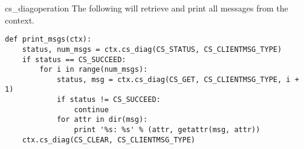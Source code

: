 \begin{methoddesc}[CS_CONTEXT]{cs_diag}{operation \optional{, \ldots}}
The following will retrieve and print all messages from the context.

\begin{verbatim}
def print_msgs(ctx):
    status, num_msgs = ctx.cs_diag(CS_STATUS, CS_CLIENTMSG_TYPE)
    if status == CS_SUCCEED:
        for i in range(num_msgs):
            status, msg = ctx.cs_diag(CS_GET, CS_CLIENTMSG_TYPE, i + 1)
            if status != CS_SUCCEED:
                continue
            for attr in dir(msg):
                print '%s: %s' % (attr, getattr(msg, attr))
    ctx.cs_diag(CS_CLEAR, CS_CLIENTMSG_TYPE)
\end{verbatim}
\end{methoddesc}

